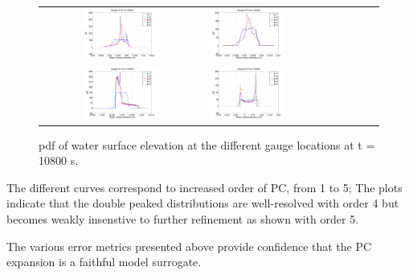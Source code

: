 \begin{figure}[h]
\centering
\begin{tabular}{clc}
        
\includegraphics[width=0.5\textwidth]{figures/pdfs1_3.pdf} &
\includegraphics[width=0.5\textwidth]{figures/pdfs2_3.pdf} \\
\includegraphics[width=0.5\textwidth]{figures/pdfs3_3.pdf} &
\includegraphics[width=0.5\textwidth]{figures/pdfs4_3.pdf}
\end{tabular}
\caption{pdf of water surface elevation at the different gauge locations at t = 10800 s.}
\label{fig:pdfs3}
\end{figure}
The different curves
correspond to increased order of PC, from 1 to 5; 
The plots indicate that the double peaked distributions are
well-resolved with order  4 but becomes weakly insenstive to further refinement 
as shown with order 5.

The various error metrics presented above 
provide confidence that the PC expansion is a faithful 
model surrogate. 

\clearpage

